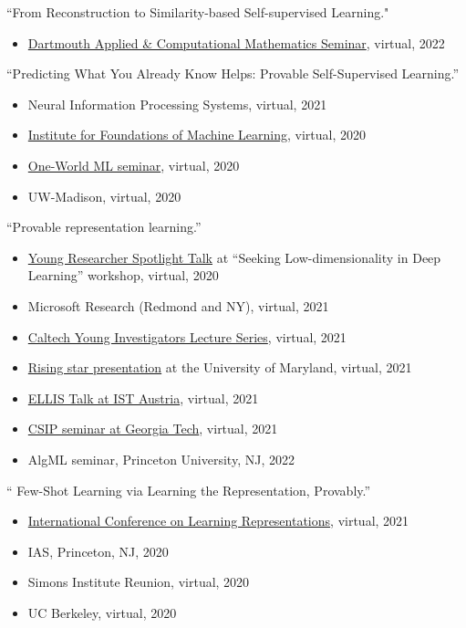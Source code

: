 \documentclass[margin, 10pt]{res} %
\begin{document}
\begin{resume}
{``From Reconstruction to Similarity-based Self-supervised Learning."}
\begin{itemize}[noitemsep,topsep=0pt,parsep=0pt,partopsep=0pt]
	\item \href{https://math.dartmouth.edu/calendar/more.php?event_id=2849}{Dartmouth Applied \& Computational Mathematics Seminar}, virtual, 2022 
\end{itemize}
{``Predicting What You Already Know Helps: Provable Self-Supervised Learning.''
	 	\begin{itemize}[noitemsep,topsep=0pt,parsep=0pt,partopsep=0pt]
	 		\item Neural Information Processing Systems, virtual, 2021
			\item \href{https://www.ifml.institute/events}{Institute for Foundations of Machine Learning}, virtual, 2020
			\item \href{https://www.oneworldml.org/past-events}{One-World ML seminar}, virtual, 2020
	 		\item UW-Madison, virtual, 2020	 
	 	\end{itemize}
}


{``Provable representation learning.''
\begin{itemize}[noitemsep,topsep=0pt,parsep=0pt,partopsep=0pt]
	\item 		\href{https://sites.google.com/view/slowdnn/}{Young Researcher Spotlight Talk} at ``Seeking Low-dimensionality in Deep Learning'' workshop, virtual, 2020 
	\item  Microsoft Research (Redmond and NY), virtual, 2021  
	\item \href{https://cms.caltech.edu/events/90169}{Caltech Young Investigators Lecture Series}, virtual, 2021
	\item \href{https://twitter.com/ml_umd/status/1458125253197058054}{Rising star presentation} at the University of Maryland, virtual, 2021
	\item  \href{https://talks-calendar.app.ist.ac.at/events/3329}{ELLIS Talk at IST Austria}, virtual, 2021
	\item \href{https://www.ece.gatech.edu/calendar/day/2021/12/03/108208?utm_source=ECE+Lists+2019&utm_campaign=a5a1732812-EMAIL_CAMPAIGN_2019_08_06_08_30_COPY_01&utm_medium=email&utm_term=0_0324b14402-a5a1732812-103287103}{CSIP seminar at Georgia Tech}, virtual, 2021
	\item AlgML seminar, Princeton University, NJ, 2022
\end{itemize}
	 }
 
 {`` Few-Shot Learning via Learning the Representation, Provably.''
 	\begin{itemize}[noitemsep,topsep=0pt,parsep=0pt,partopsep=0pt]
 		\item \href{https://iclr.cc/media/Slides/iclr/2021/virtual(07-00-00)-07-00-00UTC-2535-few-shot_learni.pdf}{International Conference on Learning Representations}, virtual, 2021
 		\item 	IAS, Princeton, NJ, 2020 
 		\item  Simons Institute Reunion, virtual, 2020 
 		\item UC Berkeley, virtual, 2020	
 	\end{itemize}
 }



\end{resume}
\end{document}
